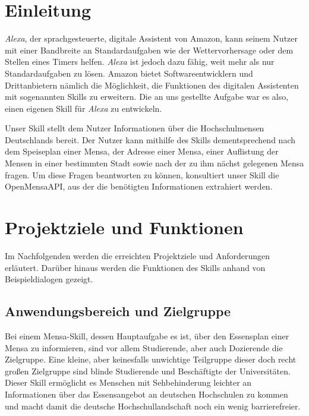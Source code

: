 \documentclass[12pt]{article}
\begin{document}
\tableofcontents
\thispagestyle{empty}
\newpage  

\section{Einleitung}
\emph{Alexa}, der sprachgesteuerte, digitale Assistent von Amazon, kann seinem Nutzer mit einer Bandbreite an Standardaufgaben wie der Wettervorhersage oder dem Stellen eines Timers helfen.
\emph{Alexa} ist jedoch dazu fähig, weit mehr als nur Standardaufgaben zu lösen.
Amazon bietet Softwareentwicklern und Drittanbietern nämlich die Möglichkeit, die Funktionen des digitalen Assistenten mit sogenannten Skills zu erweitern.
Die an uns gestellte Aufgabe war es also, einen eigenen Skill für \emph{Alexa} zu entwickeln.

Unser Skill stellt dem Nutzer Informationen über die Hochschulmensen Deutschlands bereit.
Der Nutzer kann mithilfe des Skills dementsprechend nach dem Speiseplan einer Mensa, der Adresse einer Mensa, einer Auflistung der Mensen in einer bestimmten Stadt sowie nach der zu ihm nächst gelegenen Mensa fragen.
Um diese Fragen beantworten zu können, konsultiert unser Skill die OpenMensaAPI, aus der die benötigten Informationen extrahiert werden.


\section{Projektziele und Funktionen}
Im Nachfolgenden werden die erreichten Projektziele und Anforderungen erläutert. 
Darüber hinaus werden die Funktionen des Skills anhand von Beispieldialogen gezeigt.

\subsection{Anwendungsbereich und Zielgruppe}
Bei einem Mensa-Skill, dessen Hauptaufgabe es ist, über den Essensplan einer Mensa zu informieren, sind vor allem Studierende, aber auch Dozierende die Zielgruppe.
Eine kleine, aber keinesfalls unwichtige Teilgruppe dieser doch recht großen Zielgruppe sind blinde Studierende und Beschäftigte der Universitäten.
Dieser Skill ermöglicht es Menschen mit Sehbehinderung leichter an Informationen über das Essensangebot an deutschen Hochschulen zu kommen und macht damit die deutsche Hochschullandschaft noch ein wenig barrierefreier.
\end{document}
